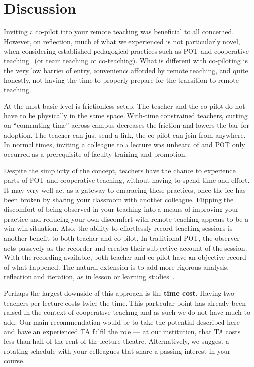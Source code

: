\documentclass[sigconf,natbib=false]{acmart}
\begin{document}
\section{Discussion}

Inviting a co-pilot into your remote teaching was beneficial to all concerned. 
However, on reflection, much of what we experienced is not particularly novel, 
when considering established pedagogical practices such as \ac{POT} and 
cooperative teaching~\cite{bauwens1995cooperative} (or team teaching or 
co-teaching). What is different with co-piloting is the very low barrier of 
entry, convenience afforded by remote teaching, and quite honestly, not having 
the time to properly prepare for the transition to remote teaching.

At the most basic level is frictionless setup. The teacher and the co-pilot do 
not have to be physically in the same space. With-time constrained teachers, 
cutting on \enquote{commuting time} across campus decreases the friction and 
lowers the bar for adoption. The teacher can just send a link, the co-pilot can 
join from anywhere. In normal times, inviting a colleague to a lecture was 
unheard of and \ac{POT} only occurred as a prerequisite of faculty training and 
promotion.

Despite the simplicity of the concept, teachers have the chance to experience 
parts of \ac{POT} and cooperative teaching, without having to spend time and 
effort. It may very well act as a gateway to embracing these practices, once 
the ice has been broken by sharing your classroom with another colleague. 
Flipping the discomfort of being observed in your teaching into a means of 
improving your practice and reducing your own discomfort with remote teaching 
appears to be a win-win situation. Also, the ability to effortlessly record 
teaching sessions is another benefit to both teacher and co-pilot. In 
traditional \ac{POT}, the observer acts passively as the recorder and creates 
their subjective account of the session. With the recording available, both 
teacher and co-pilot have an objective record of what happened. The natural 
extension is to add more rigorous analysis, reflection and iteration, as in 
lesson or learning studies~\cite{NecessaryConditionsOfLearning}.

Perhaps the largest downside of this approach is the \textbf{time cost}. Having 
two teachers per lecture costs twice the time. This particular point has 
already been raised in the context of cooperative teaching and as such we do 
not have much to add. Our main recommendation would be to take the potential 
described here and have an experienced \ac{TA} fulfil the role --- at our 
institution, that \ac{TA} costs less than half of the rent of the lecture 
theatre.
Alternatively, we suggest a rotating schedule with your colleagues that share a 
passing interest in your course.
\end{document}
